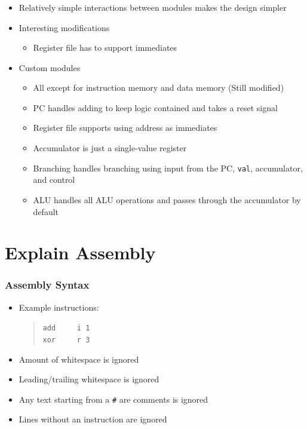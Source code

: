 	\begin{frame}
		\frametitle{}

		\begin{itemize}
			\item Relatively simple interactions between modules makes the design simpler
			\item Interesting modifications
				\begin{itemize}
					\item Register file has to support immediates
				\end{itemize}
			\item Custom modules
				\begin{itemize}
					\item All except for instruction memory and data memory (Still modified)
					\item PC handles adding to keep logic contained and takes a reset signal
					\item Register file supports using address as immediates
					\item Accumulator is just a single-value register
					\item Branching handles branching using input from the PC, \texttt{val}, accumulator, and control
					\item ALU handles all ALU operations and passes through the accumulator by default
				\end{itemize}
		\end{itemize}
	\end{frame}

	\section{Explain Assembly}

	\begin{frame}
		\frametitle{Assembly Syntax}

		\begin{itemize}
			\item Example instructions:
				\begin{quote}
					\texttt{add~~~~~i 1} \\
					\texttt{xor~~~~~r 3}
				\end{quote}
			\item Amount of whitespace is ignored
			\item Leading/trailing whitespace is ignored
			\item Any text starting from a \texttt{\#} are comments is ignored
			\item Lines without an instruction are ignored
		\end{itemize}

	\end{frame}

